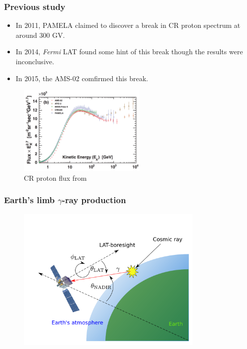 \documentclass{beamer}
\begin{document}
\begin{frame}
\frametitle{Previous study}
\begin{itemize}
  \item In 2011, PAMELA claimed to discover a break in CR proton spectrum at around 300 GV. \citep{adriani2011pamela}
  \item In 2014, \textit{Fermi} LAT found some hint of this break though the results were inconclusive. \citep{FermiEarth14}
  \item In 2015, the AMS-02 comfirmed this break.
\end{itemize}
\begin{figure}
  \includegraphics[width=0.55\textwidth]{proton_spectrum}
  \caption{CR proton flux from \cite{AMS02pr2015}}
\end{figure}
\end{frame}




\begin{frame}\frametitle{Earth's limb $\gamma$-ray production}
  \centering
  \begin{figure}[h!]
  \includegraphics[width = 0.8\textwidth]{figure/for_lat_schematic/FermiLAT.pdf}
  \end{figure}
\end{frame}
\end{document}
